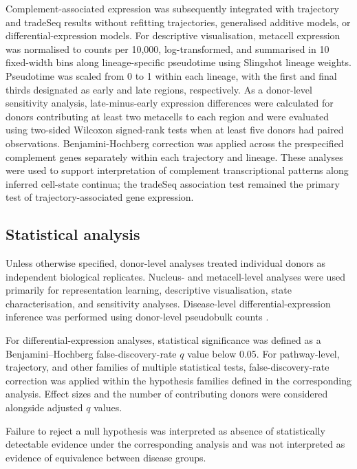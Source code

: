 \documentclass[10pt,letterpaper]{article}
\begin{document}
Complement-associated expression was subsequently integrated with trajectory and tradeSeq results without refitting trajectories, generalised additive models, or differential-expression models. For descriptive visualisation, metacell expression was normalised to counts per 10,000, log-transformed, and summarised in 10 fixed-width bins along lineage-specific pseudotime using Slingshot lineage weights. Pseudotime was scaled from 0 to 1 within each lineage, with the first and final thirds designated as early and late regions, respectively. As a donor-level sensitivity analysis, late-minus-early expression differences were calculated for donors contributing at least two metacells to each region and were evaluated using two-sided Wilcoxon signed-rank tests when at least five donors had paired observations. Benjamini-Hochberg correction was applied across the prespecified complement genes separately within each trajectory and lineage. These analyses were used to support interpretation of complement transcriptional patterns along inferred cell-state continua; the tradeSeq association test remained the primary test of trajectory-associated gene expression.



\subsection*{Statistical analysis}

Unless otherwise specified, donor-level analyses treated individual donors as independent biological replicates. Nucleus- and metacell-level analyses were used primarily for representation learning, descriptive visualisation, state characterisation, and sensitivity analyses. Disease-level differential-expression inference was performed using donor-level pseudobulk counts \cite{Zimmerman_Espeland_Langefeld_2021, Squair_Gautier_Kathe_Anderson_James_Hutson_Hudelle_Qaiser_Matson_Barraud}.

For differential-expression analyses, statistical significance was defined as a Benjamini--Hochberg false-discovery-rate $q$ value below 0.05. For pathway-level, trajectory, and other families of multiple statistical tests, false-discovery-rate correction was applied within the hypothesis families defined in the corresponding analysis. Effect sizes and the number of contributing donors were considered alongside adjusted $q$ values.

Failure to reject a null hypothesis was interpreted as absence of statistically detectable evidence under the corresponding analysis and was not interpreted as evidence of equivalence between disease groups.
\end{document}
